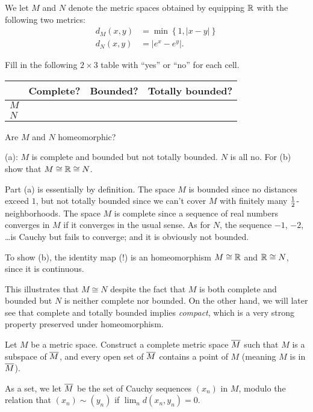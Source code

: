 \begin{problem}
	We let $M$ and $N$ denote the metric spaces obtained
	by equipping $\mathbb R$ with the following two metrics:
	\begin{align*}
		d_M(x,y) &= \min \left\{ 1, \left\lvert x-y \right\rvert \right\} \\
		d_N(x,y) &= \left\lvert e^x - e^y \right\rvert.
	\end{align*}
	\begin{enumerate}[(a)]
		\ii Fill in the following $2 \times 3$ table
		with ``yes'' or ``no'' for each cell.
		\begin{center}
		\begin{tabular}[h]{l|ccc}
			& Complete? & Bounded? & Totally bounded? \\ \hline
			$M$ \\
			$N$ \\
		\end{tabular}
		\end{center}
		\ii Are $M$ and $N$ homeomorphic?
	\end{enumerate}
	\begin{hint}
		(a): $M$ is complete and bounded
		but not totally bounded. $N$ is all no.
		For (b) show that $M \cong \mathbb R \cong N$.
	\end{hint}
	\begin{sol}
		Part (a) is essentially by definition.
		The space $M$ is bounded since no distances exceed $1$,
		but not totally bounded since we can't cover $M$
		with finitely many $\frac{1}{2}$-neighborhoods.
		The space $M$ is complete since a sequence of real
		numbers converges in $M$ if it converges in the usual sense.
		As for $N$, the sequence $-1$, $-2$, \dots is Cauchy
		but fails to converge; and it is obviously not bounded.

		To show (b), the identity map (!) is an homeomorphism $M \cong \mathbb R$
		and $\mathbb R \cong N$, since it is continuous.

		This illustrates that $M \cong N$ despite the fact
		that $M$ is both complete and bounded
		but $N$ is neither complete nor bounded.
		On the other hand, we will later see that complete
		and totally bounded implies \emph{compact},
		which is a very strong property preserved under homeomorphism.
	\end{sol}
\end{problem}


\begin{dproblem}
	\gim
	\label{prob:completion}
	Let $M$ be a metric space.
	Construct a complete metric space $\overline M$
	such that $M$ is a subspace of $\overline M$,
	and every open set of $\overline M$ contains a point of $M$
	(meaning $M$ is  in $\overline M$).
	\begin{hint}
		As a set, we let $\overline M$ be the set of Cauchy
		sequences $(x_n)$ in $M$, modulo the relation that
		$(x_n) \sim (y_n)$ if $\lim_n d(x_n, y_n) = 0$.
	\end{hint}
\end{dproblem}

